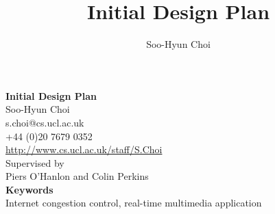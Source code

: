 \documentclass[a4paper,10pt]{article}
\title{Initial Design Plan}
\author{Soo-Hyun Choi}
\begin{document}
\begin{titlepage}
\begin{center}
{\LARGE \textsf{\textbf{Initial Design Plan\\}}}
\vspace{1cm}
{\large \textsf{Soo-Hyun Choi\\}}
{\small \textsf{s.choi@cs.ucl.ac.uk}\\}
{\small \textsf{+44 (0)20 7679 0352}\\}
{\small \url{http://www.cs.ucl.ac.uk/staff/S.Choi}\\}
\vspace{2.5cm}
{\large \textsf{Supervised by \\
Piers O'Hanlon and Colin Perkins \\}}
\vspace{2.5cm}
{\normalsize \textbf{Keywords}\\ Internet congestion control, real-time
multimedia application}
\end{center}


\end{titlepage}
\end{document}
